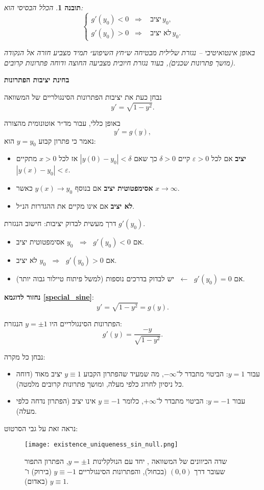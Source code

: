 \documentclass{article}
\numberwithin{equation}{section}
\newtheorem{insight}{תובנה}[section]
\begin{document}
\vspace{0.5cm}

\begin{insight}
הכלל הבסיסי הוא:
\[
\boxed{
\begin{cases}
g'(y_0) < 0 \;\;\Rightarrow\;\;\text{ יציב}\, y_0 , \\[6pt]
g'(y_0) > 0 \;\;\Rightarrow\;\;\text{ לא יציב}\, y_0 .
\end{cases}
}
\]

באופן אינטואיטיבי – נגזרת שלילית מבטיחה ש״חץ השיפוע״ תמיד מצביע חזרה אל הנקודה (מושך פתרונות שכנים),  
בעוד נגזרת חיובית מצביעה החוצה ודוחה פתרונות קרובים.
\end{insight}



\textbf{בחינת יציבות הפתרונות}

נבחן כעת את יציבות הפתרונות הסינגולריים של המשוואה
\[
y' = \sqrt{1-y^2}.
\]

באופן כללי, עבור מד״ר אוטונומית מהצורה
\[
y' = g(y),
\]
נאמר כי פתרון קבוע $y=y_0$ הוא:
\begin{itemize}
  \item \textbf{יציב} אם לכל $\varepsilon>0$ קיים $\delta>0$ כך שאם $|y(0)-y_0|<\delta$ אז לכל $x>0$ מתקיים $|y(x)-y_0|<\varepsilon$.
  \item \textbf{אסימפטוטית יציב} אם בנוסף $y(x)\to y_0$ כאשר $x\to\infty$.
  \item \textbf{לא יציב} אם אינו מקיים את ההגדרות הנ״ל.
\end{itemize}

דרך מעשית לבדוק יציבות:  
חישוב הנגזרת $g'(y_0)$.  
\begin{itemize}
  \item אם $g'(y_0)<0$ $\;\Rightarrow\;$ $y_0$ אסימפטוטית יציב.  
  \item אם $g'(y_0)>0$ $\;\Rightarrow\;$ $y_0$ לא יציב.  
  \item אם $g'(y_0)=0$ $\;\leftarrow\;$ יש לבדוק בדרכים נוספות (למשל פיתוח טיילור גבוה יותר).
\end{itemize}

\textbf{
נחזור לדוגמא \ref{special_sine}}:
\[
y'=\sqrt{1-y^2}=g(y).
\]

הפתרונות הסינגולריים היו $y=\pm 1$ הנגזרת:
\[
g'(y) = \frac{-y}{\sqrt{1-y^2}}.
\]

נבחן כל מקרה:
\begin{itemize}
  \item עבור $y=1$: הביטוי מתבדר ל־$-\infty$, מה שמעיד שהפתרון הקבוע $y\equiv 1$ יציב מאוד (דוחה כל ניסיון לחרוג כלפי מעלה, ומושך פתרונות קרובים מלמטה).
  \item עבור $y=-1$: הביטוי מתבדר ל־$+\infty$, כלומר $y\equiv -1$ אינו יציב (הפתרון נדחה כלפי מעלה).
\end{itemize}
נראה זאת על גבי הסרטוט:
\begin{figure}[H]
    \centering
    \texttt{[image: existence\_uniqueness\_sin\_null.png]}
    \caption{שדה הכיוונים של המשוואה 
    , יחד עם הנולקלינות $y=\pm1$, 
    הפתרון התפור שעובר דרך $(0,0)$ (בכחול), 
    והפתרונות הסינגולריים $y\equiv -1$ (בירוק) ו־$y\equiv 1$ (באדום).}
    \label{fig:existence_uniqueness_sin_null}
\end{figure}
\end{document}
